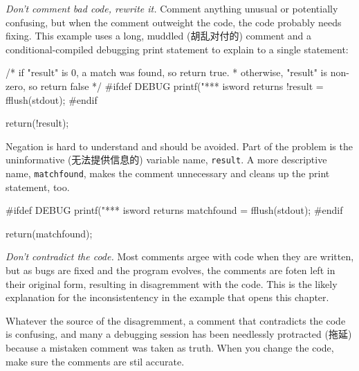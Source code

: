 \emph{Don't comment bad code, rewrite it.} Comment anything unusual or
potentially confusing, but when the comment outweight the code, the code
probably needs fixing. This example uses a long, muddled (胡乱对付的)
comment and a conditional-compiled debugging print statement to explain to
a single statement:
\begin{badcode}
    /* if "result" is 0, a match was found, so return true.
     * otherwise, "result" is non-zero, so return false 
     */
    #ifdef DEBUG 
    printf("*** isword returns !result = %
    fflush(stdout);
    #endif

    return(!result);
\end{badcode}
Negation is hard to understand and should be avoided. Part of the problem
is the uninformative (无法提供信息的) variable name, \verb'result'. A more
descriptive name, \verb'matchfound', makes the comment unnecessary and
cleans up the print statement, too.
\begin{wellcode}
    #ifdef DEBUG
    printf("*** isword returns matchfound = %
    fflush(stdout);
    #endif

    return(matchfound);
\end{wellcode}

\emph{Don't contradict the code.} Most comments argee with code when they
are written, but as bugs are fixed and the program evolves, the comments
are foten left in their original form, resulting in disagremment with the
code. This is the likely explanation for the inconsistentency in the
example that opens this chapter.

Whatever the source of the disagremment, a comment that contradicts the
code is confusing, and many a debugging session has been needlessly
protracted (拖延) because a mistaken comment was taken as truth. When you
change the code, make sure the comments are stil accurate.

